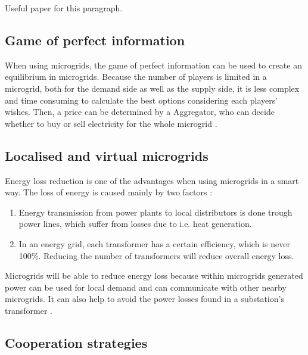 Useful paper for this paragraph\cite{MicrogridModellingPetrosAristidou,HatziargyriouAsanoIravaniMarnay2007}.

\subsection{Game of perfect information}
When using microgrids, the game of perfect information can be used to create an equilibrium in microgrids. Because the number of players is limited in a microgrid, both for the demand side as well as the supply side, it is less complex and time consuming to calculate the best options considering each players' wishes. Then, a price can be determined by a Aggregator, who can decide whether to buy or sell electricity for the whole microgrid  \cite{MicrogridModellingPetrosAristidou}.

\subsection{Localised and virtual microgrids}
Energy loss reduction is one of the advantages when using microgrids in a smart way. The loss of energy is caused mainly by two factors \cite{EnergyLossURL}: 

\begin{enumerate}
\item Energy transmission from power plants to local distributors is done trough power lines, which suffer from losses due to i.e. heat generation\cite{LasseterPaigi2004}.
\item In an energy grid, each transformer has a certain efficiency, which is never 100\%. Reducing the number of transformers will reduce overall energy loss.
\end{enumerate}

Microgrids will be able to reduce energy loss because within microgrids generated power can be used for local demand and can communicate with other nearby microgrids. It can also help to avoid the power losses found in a substation's transformer \cite{keypaper}.


\subsection{Cooperation strategies}


